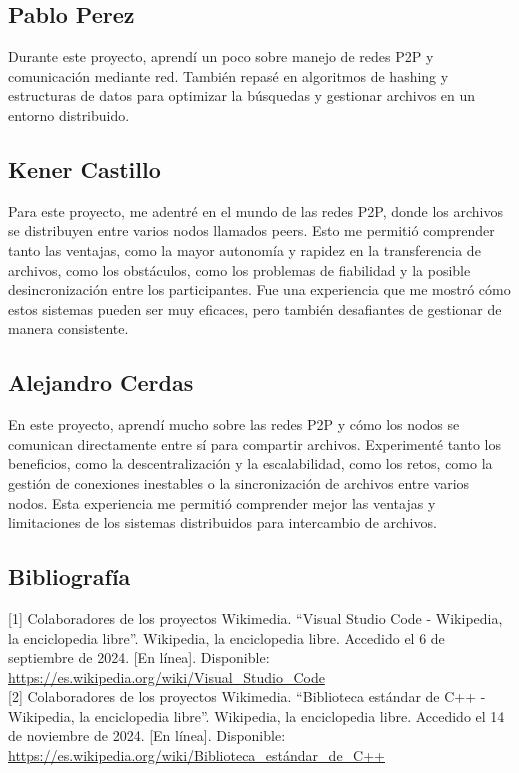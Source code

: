 \documentclass{article}
\begin{document}
\subsection{Pablo Perez}
Durante este proyecto, aprend\'i un poco sobre manejo de redes P2P y comunicaci\'on mediante red. Tambi\'en repas\'e en algoritmos de hashing y estructuras de datos para optimizar la b\'usquedas y gestionar archivos en un entorno distribuido.

\subsection{Kener Castillo}
Para este proyecto, me adentré en el mundo de las redes P2P, donde los archivos se 
distribuyen entre varios nodos llamados peers. 
Esto me permitió comprender tanto las ventajas, como la mayor autonomía y rapidez en la transferencia de archivos, 
como los obstáculos, como los problemas de fiabilidad y la posible desincronización entre los participantes. 
Fue una experiencia que me mostró cómo estos sistemas pueden ser muy eficaces, pero también desafiantes de gestionar de manera consistente.
    
\subsection{Alejandro Cerdas}
En este proyecto, aprendí mucho sobre las redes P2P y cómo los nodos se comunican directamente entre sí para compartir archivos. Experimenté tanto los beneficios, como la descentralización y la escalabilidad, como los retos, como la gestión de conexiones inestables o la sincronización de archivos entre varios nodos. Esta experiencia me permitió comprender mejor las ventajas y limitaciones de los sistemas distribuidos para intercambio de archivos.


\subsection{Bibliografía}
[1] Colaboradores de los proyectos Wikimedia. “Visual Studio Code - Wikipedia, la enciclopedia libre”. Wikipedia, la enciclopedia libre. Accedido el 6 de septiembre de 2024. [En línea]. Disponible: \href{https://es.wikipedia.org/wiki/Visual\_Studio\_Code}{https://es.wikipedia.org/wiki/Visual\_Studio\_Code}\\

[2] Colaboradores de los proyectos Wikimedia. “Biblioteca estándar de C++ - Wikipedia, la enciclopedia libre”. Wikipedia, la enciclopedia libre. Accedido el 14 de noviembre de 2024. [En línea]. Disponible: \href{https://es.wikipedia.org/wiki/Biblioteca_estándar_de_C++}{https://es.wikipedia.org/wiki/Biblioteca\_estándar\_de\_C++}\\
\end{document}

